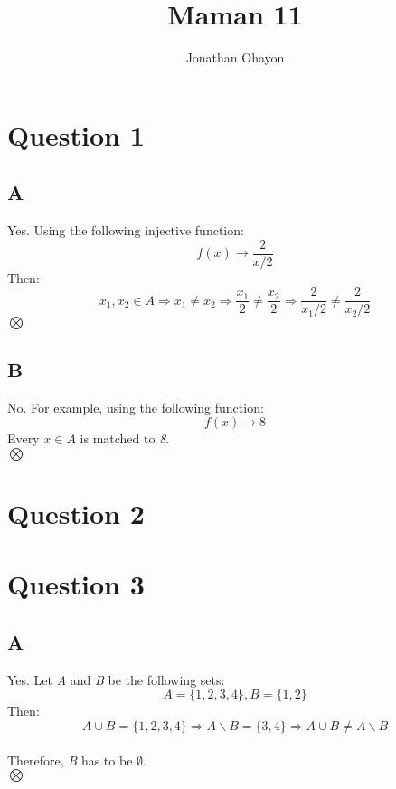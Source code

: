 \documentclass[12pt, oneside]{article}
\title{Maman 11}
\author{Jonathan Ohayon}
\begin{document}
\maketitle

\section{Question 1}
\subsection{A}
Yes. Using the following injective function:
\begin{equation*}
f(x) \rightarrow \frac{2}{x/2}
\end{equation*}
Then:
\begin{equation*}
x_1, x_2 \in A \Rightarrow
x_1 \neq x_2 \Rightarrow
\frac{x_1}{2} \neq \frac{x_2}{2} \Rightarrow
\frac{2}{x_1/2} \neq \frac{2}{x_2/2}
\end{equation*}
$\bigotimes$

\subsection{B}
No. For example, using the following function:
\begin{equation*}
f(x) \rightarrow 8
\end{equation*}
Every $x \in A$ is matched to \emph{8}.\\
$\bigotimes$

\section{Question 2}

\section{Question 3}
\subsection{A}
Yes. Let \emph{A} and \emph{B} be the following sets:
\begin{equation*}
A = \{1, 2, 3, 4\}, B = \{1, 2\}
\end{equation*}
Then:
\begin{equation*}
A \cup B = \{1, 2, 3, 4\}\Rightarrow
A \backslash B = \{3, 4\}\Rightarrow
A \cup B \neq A \backslash B
\end{equation*}\\
Therefore, \emph{B} has to be $\emptyset$.\\
$\bigotimes$
\end{document}
